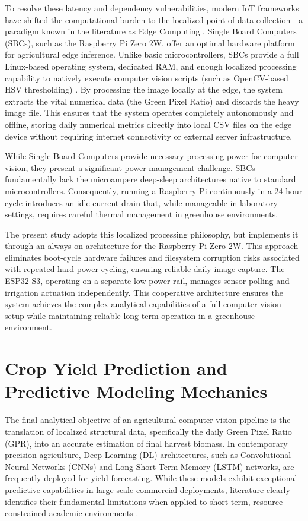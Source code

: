 To resolve these latency and dependency vulnerabilities, modern IoT frameworks have shifted the computational burden to the localized point of data collection—a paradigm known in the literature as Edge Computing \cite{Shi2016}. Single Board Computers (SBCs), such as the Raspberry Pi Zero 2W, offer an optimal hardware platform for agricultural edge inference. Unlike basic microcontrollers, SBCs provide a full Linux-based operating system, dedicated RAM, and enough localized processing capability to natively execute computer vision scripts (such as OpenCV-based HSV thresholding) \cite{Zamora2019}. By processing the image locally at the edge, the system extracts the vital numerical data (the Green Pixel Ratio) and discards the heavy image file. This ensures that the system operates completely autonomously and offline, storing daily numerical metrics directly into local CSV files on the edge device without requiring internet connectivity or external server infrastructure.

While Single Board Computers provide necessary processing power for computer vision, they present a significant power-management challenge. SBCs fundamentally lack the microampere deep-sleep architectures native to standard microcontrollers. Consequently, running a Raspberry Pi continuously in a 24-hour cycle introduces an idle-current drain that, while manageable in laboratory settings, requires careful thermal management in greenhouse environments.

The present study adopts this localized processing philosophy, but implements it through an always-on architecture for the Raspberry Pi Zero 2W. This approach eliminates boot-cycle hardware failures and filesystem corruption risks associated with repeated hard power-cycling, ensuring reliable daily image capture. The ESP32-S3, operating on a separate low-power rail, manages sensor polling and irrigation actuation independently. This cooperative architecture ensures the system achieves the complex analytical capabilities of a full computer vision setup while maintaining reliable long-term operation in a greenhouse environment.

\section{Crop Yield Prediction and Predictive Modeling Mechanics}

The final analytical objective of an agricultural computer vision pipeline is the translation of localized structural data, specifically the daily Green Pixel Ratio (GPR), into an accurate estimation of final harvest biomass. In contemporary precision agriculture, Deep Learning (DL) architectures, such as Convolutional Neural Networks (CNNs) and Long Short-Term Memory (LSTM) networks, are frequently deployed for yield forecasting. While these models exhibit exceptional predictive capabilities in large-scale commercial deployments, literature clearly identifies their fundamental limitations when applied to short-term, resource-constrained academic environments \cite{Kamilaris2018}. 

